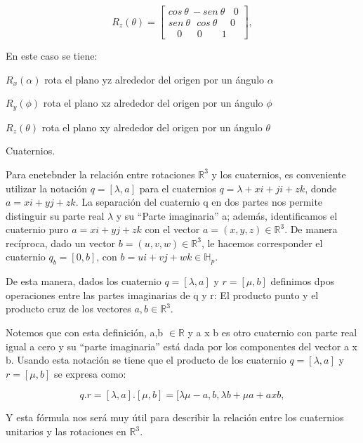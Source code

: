 \documentclass[a4paper,10pt]{article}
\begin{document}
\begin{equation}
R_z(\theta) =
\left
[\begin{array}{lcr}
cos \ \theta \ -sen \ \theta \ \ \ \ 0 \\ sen \ \theta \ \ \ cos \ \theta \ \ \ \ \ \ 0 \\ \ \ \ \ 0 \ \ \ \ \ \ \ 0 \ \ \ \ \ \ \ \ \ 1
\end{array}\right],
\end{equation}

En este caso se tiene:

$R_x(\alpha)$ rota el plano yz alrededor del origen por un ángulo $\alpha$

$R_y(\phi)$ rota el plano xz alrededor del origen por un ángulo $\phi$

$R_z(\theta)$ rota el plano xy alrededor del origen por un ángulo $\theta$


\Large
Cuaternios.


Para enetebnder la relación entre rotaciones $\mathbb{R}^3$ y los cuaternios, es conveniente utilizar la notación $q = [\lambda,a]$ para el cuaternios $q = \lambda + xi + ji + zk$, donde $a = xi + yj + zk$. La separación del cuaternio q en dos partes nos permite distinguir su parte real $\lambda$ y su ``Parte imaginaria'' a; además, identificamos el cuaternio puro $a = xi + yj + zk$ con el vector $a = (x,y,z)\in \mathbb{R}^3$. De manera recíproca, dado un vector $b = (u,v,w)\in \mathbb{R}^3$, le hacemos corresponder el cuaternio $q_b = [0,b]$, con $b = ui + vj + wk \in \mathbb{H}_p$.


De esta manera, dados los cuaternio $q = [\lambda,a]$ y $r = [\mu,b]$ definimos dpos operaciones entre las partes imaginarias de q y r: El producto punto y el producto cruz de los vectores $a,b \in \mathbb{R}^3$.


Notemos que con esta definición, {a,b} $\in \mathbb{R}$ y a x b es otro cuaternio con parte real igual a cero y su ``parte imaginaria'' está dada por los componentes del vector a x b. Usando esta notación se tiene que el producto de los cuaternio $q = [\lambda,a]$ y $r = [\mu,b]$ se expresa como:

\begin{equation}
 q . r = [\lambda,a] . [\mu,b] = [\lambda \mu - {a,b}, \lambda b + \mu a + a x b,
\end{equation}


Y esta fórmula nos será muy útil para describir la relación entre los cuaternios unitarios y las rotaciones en $\mathbb{R}^3$.
\end{document}
